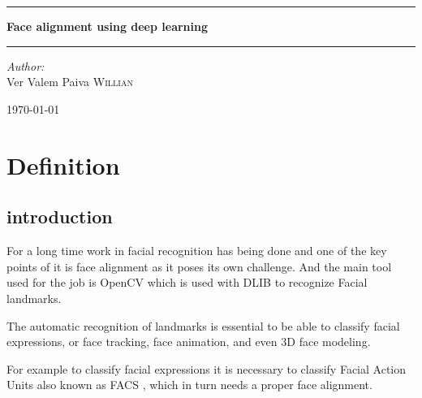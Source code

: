 \documentclass[11pt]{article}
\date{}
\title{}
\begin{document}
\begin{titlepage}
\begin{center}


\textsc{\LARGE}\\[1.5cm]

\textsc{\Large}\\[0.5cm]


\vspace{1cm}
\hrule
\vspace{1cm}


{\huge \bfseries Face alignment using deep learning}


\vspace{1cm}
\hrule
\vspace{1cm}


\begin{minipage}{0.4\textwidth}
\emph{Author:} \\
Ver Valem Paiva \textsc{Willian}\\
\end{minipage}

\vfill

{\large \today}

\end{center}
\end{titlepage}


\tableofcontents
\newpage


\section{Definition}
\label{sec:orgb15ca06}

\subsection{introduction}
\label{sec:orge690953}

For a long time work in facial recognition has being done and one of the key
points of it is face alignment as it poses its own challenge.
And the main tool used for the job is OpenCV which is used with DLIB to
recognize Facial landmarks.

The automatic recognition of landmarks is essential to be able to classify
facial expressions, or face tracking, face animation, and even 3D face
modeling.

For example to classify facial expressions it is necessary to classify
Facial Action Units also known as FACS \cite{ekman1977facial}, which in turn
needs a proper face alignment.
\end{document}
